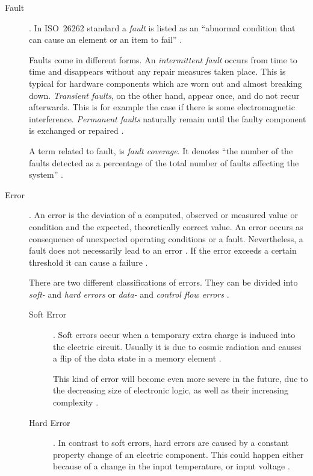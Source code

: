 \begin{description}
\item [Fault] .
In \mbox{ISO 26262} standard a \emph{fault} is listed as an ``abnormal condition that can cause an element or an item to fail'' \cite{iso26262:1} \cite{autosar_glossary}. 

Faults come in different forms. An \emph{intermittent fault} occurs from time to time and disappears without any repair measures taken place. This is typical for hardware components which are worn out and almost breaking down. \emph{Transient faults}, on the other hand, appear once, and do not recur afterwards. This is for example the case if there is some electromagnetic interference. \emph{Permanent faults} naturally remain until the faulty component is exchanged or repaired \cite{iso26262:1}.

A term related to fault, is \emph{fault coverage}. It denotes ``the number of the faults detected as a percentage of the total number of faults affecting the system'' \cite{elattar2007}.


\item [Error] .
An error is the deviation of a computed, observed or measured value or condition and the expected, theoretically correct value. An error occurs as consequence of unexpected operating conditions or a fault.
Nevertheless, a fault does not necessarily lead to an error \cite{iso26262:1} \cite{nelson} \cite{autosar_glossary}. If the error exceeds a certain threshold it can cause a failure \cite{autosar_glossary}.

There are two different classifications of errors. They can be divided into \emph{soft-} and \emph{hard errors} or \emph{data-} and \emph{control flow errors} \cite{israr2014} \cite{elattar2007}.
	\begin{description}
	\item [Soft Error] .
	Soft errors occur when a temporary extra charge is induced into the electric circuit. Usually it is due to cosmic radiation and causes a flip of the data state in a memory element \cite{israr2014} \cite{elattar2007}.

	This kind of error will become even more severe in the future, due to the decreasing size of electronic logic, as well as their increasing complexity \cite{elattar2007}.

	\item [Hard Error] .
	In contrast to soft errors, hard errors are caused by a constant property change of an electric component. This could happen either because of a change in the input temperature, or input voltage \cite{israr2014}.
	\end{description}


\end{description}
